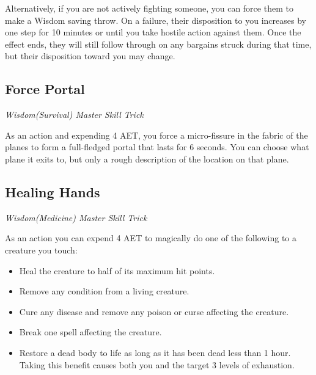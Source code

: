 Alternatively, if you are not actively fighting someone, you can force them to make a Wisdom saving throw. On a failure, their disposition to you increases by one step for 10 minutes or until you take hostile action against them. Once the effect ends, they will still follow through on any bargains struck during that time, but their disposition toward you may change.

\subsection{Force Portal}

\textit{Wisdom(Survival) Master Skill Trick}

As an action and expending 4 AET, you force a micro-fissure in the fabric of the planes to form a full-fledged portal that lasts for 6 seconds. You can choose what plane it exits to, but only a rough description of the location on that plane.

\subsection{Healing Hands}

\textit{Wisdom(Medicine) Master Skill Trick}

As an action you can expend 4 AET to magically do one of the following to a creature you touch:
\begin{itemize}
	\item Heal the creature to half of its maximum hit points.
	\item Remove any condition from a living creature.
	\item Cure any disease and remove any poison or curse affecting the creature.
	\item Break one spell affecting the creature.
	\item Restore a dead body to life as long as it has been dead less than 1 hour. Taking this benefit causes both you and the target 3 levels of exhaustion.
\end{itemize}